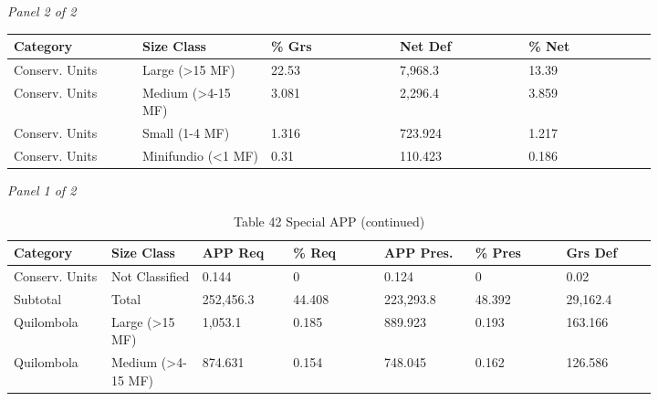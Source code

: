 \documentclass[12pt]{article}
\begin{document}
\begin{landscape}
\begin{table}[H]
\textit{Panel 2 of 2}\\[2pt]
{\fontsize{12}{14}\selectfont
\setlength{\tabcolsep}{3pt}
\renewcommand{\arraystretch}{1.08}
\begin{tabular}{p{0.164\linewidth}p{0.164\linewidth}p{0.164\linewidth}p{0.164\linewidth}p{0.164\linewidth}}
\toprule
Category & Size Class & \% Grs & Net Def & \% Net \\
\midrule
Conserv. Units & Large (>15 MF) & 22.53 & 7,968.3 & 13.39 \\
Conserv. Units & Medium (>4-15 MF) & 3.081 & 2,296.4 & 3.859 \\
Conserv. Units & Small (1-4 MF) & 1.316 & 723.924 & 1.217 \\
Conserv. Units & Minifundio (<1 MF) & 0.31 & 110.423 & 0.186 \\
\bottomrule
\end{tabular}
}
\end{table}
\begin{table}[H]
\centering
\caption{Table 42 Special APP (continued)}
\textit{Panel 1 of 2}\\[2pt]
{\fontsize{12}{14}\selectfont
\setlength{\tabcolsep}{3pt}
\renewcommand{\arraystretch}{1.08}
\begin{tabular}{p{0.117\linewidth}p{0.117\linewidth}p{0.117\linewidth}p{0.117\linewidth}p{0.117\linewidth}p{0.117\linewidth}p{0.117\linewidth}}
\toprule
Category & Size Class & APP Req & \% Req & APP Pres. & \% Pres & Grs Def \\
\midrule
Conserv. Units & Not Classified & 0.144 & 0 & 0.124 & 0 & 0.02 \\
Subtotal & Total & 252,456.3 & 44.408 & 223,293.8 & 48.392 & 29,162.4 \\
Quilombola & Large (>15 MF) & 1,053.1 & 0.185 & 889.923 & 0.193 & 163.166 \\
Quilombola & Medium (>4-15 MF) & 874.631 & 0.154 & 748.045 & 0.162 & 126.586 \\
\bottomrule
\end{tabular}
}

\vspace{0.6em}


\end{table}
\end{landscape}
\end{document}

